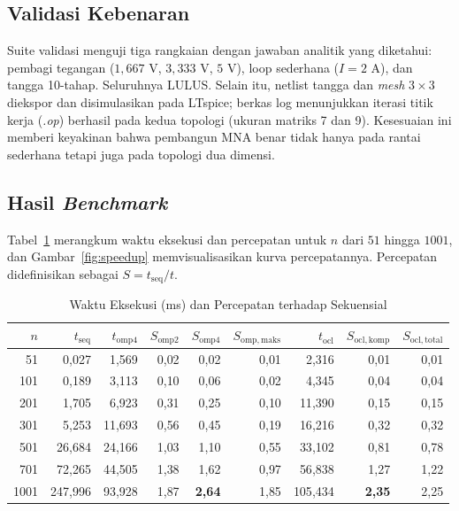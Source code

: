 \documentclass[conference]{IEEEtran}
\begin{document}
\subsection{Validasi Kebenaran}
Suite validasi menguji tiga rangkaian dengan jawaban analitik yang diketahui: pembagi tegangan ($1{,}667$ V, $3{,}333$ V, $5$ V), loop sederhana ($I=2$ A), dan tangga 10-tahap. Seluruhnya LULUS. Selain itu, netlist tangga dan \emph{mesh} $3\times3$ diekspor dan disimulasikan pada LTspice; berkas log menunjukkan iterasi titik kerja (\emph{.op}) berhasil pada kedua topologi (ukuran matriks 7 dan 9). Kesesuaian ini memberi keyakinan bahwa pembangun MNA benar tidak hanya pada rantai sederhana tetapi juga pada topologi dua dimensi.

\subsection{Hasil \emph{Benchmark}}
Tabel~\ref{tab:hasil} merangkum waktu eksekusi dan percepatan untuk $n$ dari $51$ hingga $1001$, dan Gambar~\ref{fig:speedup} memvisualisasikan kurva percepatannya. Percepatan didefinisikan sebagai $S = t_\mathrm{seq}/t$.

\begin{table}[t]
\caption{Waktu Eksekusi (ms) dan Percepatan terhadap Sekuensial}
\label{tab:hasil}
\centering
\renewcommand{\arraystretch}{1.2}
\begin{tabular}{@{}r r r r r r r r r@{}}
\toprule
$n$ & $t_\mathrm{seq}$ & $t_\mathrm{omp4}$ & $S_\mathrm{omp2}$ & $S_\mathrm{omp4}$ & $S_\mathrm{omp,maks}$ & $t_\mathrm{ocl}$ & $S_\mathrm{ocl,komp}$ & $S_\mathrm{ocl,total}$ \\
\midrule
51   & 0{,}027  & 1{,}569  & 0{,}02 & 0{,}02 & 0{,}01 & 2{,}316  & 0{,}01 & 0{,}01 \\
101  & 0{,}189  & 3{,}113  & 0{,}10 & 0{,}06 & 0{,}02 & 4{,}345  & 0{,}04 & 0{,}04 \\
201  & 1{,}705  & 6{,}923  & 0{,}31 & 0{,}25 & 0{,}10 & 11{,}390 & 0{,}15 & 0{,}15 \\
301  & 5{,}253  & 11{,}693 & 0{,}56 & 0{,}45 & 0{,}19 & 16{,}216 & 0{,}32 & 0{,}32 \\
501  & 26{,}684 & 24{,}166 & 1{,}03 & 1{,}10 & 0{,}55 & 33{,}102 & 0{,}81 & 0{,}78 \\
701  & 72{,}265 & 44{,}505 & 1{,}38 & 1{,}62 & 0{,}97 & 56{,}838 & 1{,}27 & 1{,}22 \\
1001 & 247{,}996& 93{,}928 & 1{,}87 & \textbf{2{,}64} & 1{,}85 & 105{,}434 & \textbf{2{,}35} & 2{,}25 \\
\bottomrule
\end{tabular}
\end{table}
\end{document}
